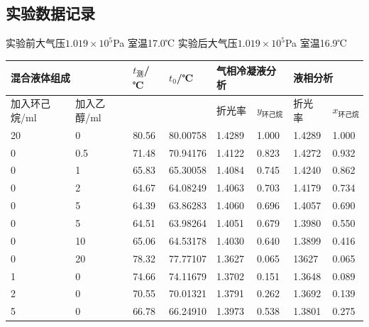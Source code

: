 \documentclass[12pt,hyperref,a4paper,UTF8]{ctexart}
\begin{document}
\subsection{实验数据记录}
实验前大气压$1.019\times10^5$Pa   室温17.0℃   实验后大气压$1.019\times10^5$Pa   室温16.9℃
\begin{table}[H]
\begin{tabular}{|ll|l|l|ll|ll|}
\hline
\multicolumn{2}{|l|}{混合液体组成}             & $t_{\text{测}}$/℃   & $t_0$/℃       & \multicolumn{2}{l|}{气相冷凝液分析}        & \multicolumn{2}{l|}{液相分析}           \\ \hline
\multicolumn{1}{|l|}{加入环己烷/ml} & 加入乙醇/ml &       &          & \multicolumn{1}{l|}{折光率}    & $y_{\text{环己烷}} $ & \multicolumn{1}{l|}{折光率}    & $x_{\text{环己烷}}$  \\ \hline
\multicolumn{1}{|l|}{20}       & 0       & 80.56 & 80.00758 & \multicolumn{1}{l|}{1.4289} & 1.000 & \multicolumn{1}{l|}{1.4289} & 1.000 \\ \hline
\multicolumn{1}{|l|}{0}        & 0.5     & 71.48 & 70.94176 & \multicolumn{1}{l|}{1.4122} & 0.823 & \multicolumn{1}{l|}{1.4272} & 0.932 \\ \hline
\multicolumn{1}{|l|}{0}        & 1       & 65.83 & 65.30058 & \multicolumn{1}{l|}{1.4084} & 0.745 & \multicolumn{1}{l|}{1.4240} & 0.862 \\ \hline
\multicolumn{1}{|l|}{0}        & 2       & 64.67 & 64.08249 & \multicolumn{1}{l|}{1.4063} & 0.703 & \multicolumn{1}{l|}{1.4179} & 0.734 \\ \hline
\multicolumn{1}{|l|}{0}        & 5       & 64.39 & 63.86283 & \multicolumn{1}{l|}{1.4060} & 0.696 & \multicolumn{1}{l|}{1.4057} & 0.690 \\ \hline
\multicolumn{1}{|l|}{0}        & 5       & 64.51 & 63.98264 & \multicolumn{1}{l|}{1.4051} & 0.679 & \multicolumn{1}{l|}{1.3980} & 0.550 \\ \hline
\multicolumn{1}{|l|}{0}        & 10      & 65.06 & 64.53178 & \multicolumn{1}{l|}{1.4030} & 0.640 & \multicolumn{1}{l|}{1.3899} & 0.416 \\ \hline
\multicolumn{1}{|l|}{0}        & 20      & 78.32 & 77.77107 & \multicolumn{1}{l|}{1.3627} & 0.065 & \multicolumn{1}{l|}{13627}  & 0.065 \\ \hline
\multicolumn{1}{|l|}{1}        & 0       & 74.66 & 74.11679 & \multicolumn{1}{l|}{1.3702} & 0.151 & \multicolumn{1}{l|}{1.3648} & 0.089 \\ \hline
\multicolumn{1}{|l|}{2}        & 0       & 70.55 & 70.01321 & \multicolumn{1}{l|}{1.3791} & 0.262 & \multicolumn{1}{l|}{1.3692} & 0.139 \\ \hline
\multicolumn{1}{|l|}{5}        & 0       & 66.78 & 66.24910 & \multicolumn{1}{l|}{1.3973} & 0.538 & \multicolumn{1}{l|}{1.3801} & 0.275 \\ \hline
\end{tabular}
\end{table}
\end{document}

